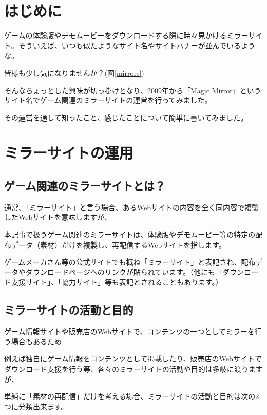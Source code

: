 \section{はじめに}

ゲームの体験版やデモムービーをダウンロードする際に時々見かけるミラーサイト。そういえば、いつも似たようなサイト名やサイトバナーが並んでいるような。

皆様も少し気になりませんか？(図\ref{mirrors})

 

そんなちょっとした興味が切っ掛けとなり、2009年から「Magic Mirror」というサイト名でゲーム関連のミラーサイトの運営を行ってみました。\cite{MagicMirror}

その運営を通して知ったこと、感じたことについて簡単に書いてみました。

 

\section{ミラーサイトの運用}

\subsection{ゲーム関連のミラーサイトとは？}

通常、「ミラーサイト」と言う場合、あるWebサイトの内容を全く同内容で複製したWebサイトを意味しますが、

本記事で扱うゲーム関連のミラーサイトは、体験版やデモムービー等の特定の配布データ（素材）だけを複製し、再配信するWebサイトを指します。

ゲームメーカさん等の公式サイトでも概ね「ミラーサイト」と表記され、配布データやダウンロードページへのリンクが貼られています。（他にも「ダウンロード支援サイト」、「協力サイト」等も表記とされることもあります。）

 

\subsection{ミラーサイトの活動と目的}

ゲーム情報サイトや販売店のWebサイトで、コンテンツの一つとしてミラーを行う場合もあるため

例えば独自にゲーム情報をコンテンツとして掲載したり、販売店のWebサイトでダウンロード支援を行う等、各々のミラーサイトの活動や目的は多岐に渡りますが、

単純に「素材の再配信」だけを考える場合、ミラーサイトの活動と目的は次の2つに分類出来ます。\cite{fuzzy2_2}

